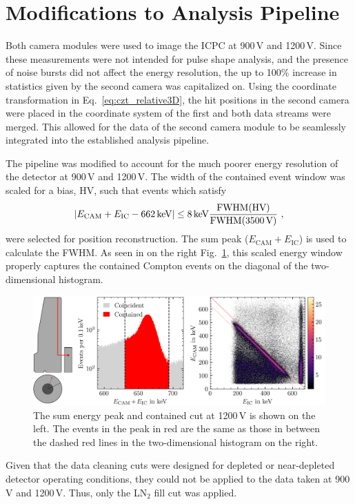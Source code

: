 \section{Modifications to Analysis Pipeline}

Both camera modules were used to image the ICPC at 900\,V and 1200\,V. Since these measurements were not intended for pulse shape analysis, and the presence of noise bursts did not affect the energy resolution, the up to 100\% increase in statistics given by the second camera was capitalized on. Using the coordinate transformation in Eq.~\ref{eq:czt_relative3D}, the hit positions in the second camera were placed in the coordinate system of the first and both data streams were merged. This allowed for the data of the second camera module to be seamlessly integrated into the established analysis pipeline. 

The pipeline was modified to account for the much poorer energy resolution of the detector at 900\,V and 1200\,V. The width of the contained event window was scaled for a bias, HV, such that events which satisfy 
\begin{equation}
	\left|E_\text{CAM} + E_\text{IC} - 662\,\text{keV}\right| \leq 8\,\text{keV}\frac{\text{FWHM(HV)}}{\text{FWHM(3500\,V)}}~,
\end{equation}
were selected for position reconstruction. The sum peak ($E_\text{CAM}+E_\text{IC}$) is used to calculate the FWHM. As seen in on the right Fig.~\ref{fig:z_reconstruction_energy_HV_1200}, this scaled energy window properly captures the contained Compton events on the diagonal of the two-dimensional histogram.
\begin{figure}[htb]
    \centering
    \includegraphics[width=6in]{figs/bubbles/z_reconstruction_energy_HV_1200.png}
    \caption{The sum energy peak and contained cut at 1200\,V is shown on the left. The events in the peak in red are the same as those in between the dashed red lines in the two-dimensional histogram on the right.}
	\label{fig:z_reconstruction_energy_HV_1200}
\end{figure}
Given that the data cleaning cuts were designed for depleted or near-depleted detector operating conditions, they could not be applied to the data taken at 900\,V and 1200\,V. Thus, only the LN$_2$ fill cut was applied. 


